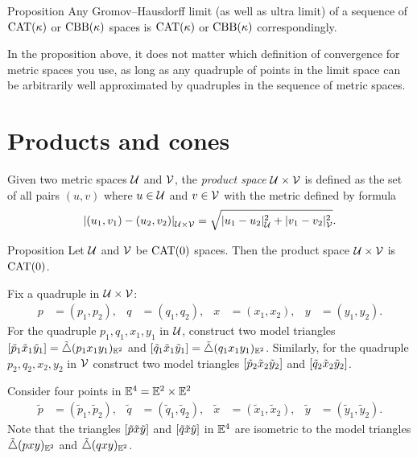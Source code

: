 \begin{thm}{Proposition}\label{prop:cat-limit}
Any Gromov--Hausdorff limit (as well as ultra limit) of a sequence of $\mathrm{CAT}(\kappa)$ or $\mathrm{CBB}(\kappa)$ spaces is $\mathrm{CAT}(\kappa)$ or $\mathrm{CBB}(\kappa)$ correspondingly. 
\end{thm}

In the proposition above, 
it does not matter which definition of convergence for metric spaces you use, 
as long as any quadruple of points in the limit space can be arbitrarily well approximated by  quadruples in the sequence of metric spaces. 

\section{Products and cones}

Given two metric spaces $\mathcal{U}$ and $\mathcal{V}$, the \emph{product space} 
$\mathcal{U}\times\mathcal{V}$ is defined as the set of all pairs $(u,v)$ where $u\in\mathcal{U}$ and $v\in \mathcal{V}$ 
with the metric defined by formula
\[\dist{(u_1,v_1)}{(u_2,v_2)}{\spc{U}\times\spc{V}}=\sqrt{\dist[2]{u_1}{u_2}{\spc{U}}+\dist[2]{v_1}{v_2}{\spc{V}}}.\]

\begin{thm}{Proposition}\label{ex:product-CAT}
Let $\mathcal{U}$ and $\mathcal{V}$ be $\mathrm{CAT}(0)$ spaces.
Then the product space $\mathcal{U}\times\mathcal{V}$ is $\mathrm{CAT}(0)$.
\end{thm}

Fix a quadruple in $\mathcal{U}\times \mathcal{V}$:
\begin{align*}
p&=(p_1,p_2),
&
q&=(q_1,q_2), 
&
x&=(x_1,x_2),
&
y&=(y_1,y_2).
\end{align*}
For the quadruple $p_1,q_1,x_1,y_1$ in $\mathcal{U}$,
construct two model triangles $[\tilde p_1\tilde x_1\tilde y_1]=\tilde\triangle(p_1x_1y_1)_{\mathbb{E}^2}$ 
and $[\tilde q_1\tilde x_1\tilde y_1]=\tilde\triangle(q_1x_1y_1)_{\mathbb{E}^2}$.  
Similarly, for the quadruple $p_2,q_2,x_2,y_2$ in $\mathcal{V}$
construct two model triangles $[\tilde p_2\tilde x_2\tilde y_2]$ and $[\tilde q_2\tilde x_2\tilde y_2]$.

Consider four points in $\mathbb{E}^4=\mathbb{E}^2\times\mathbb{E}^2$ 
\begin{align*}
\tilde p&=(\tilde p_1,\tilde p_2),
&
\tilde q&=(\tilde q_1,\tilde q_2),
&
\tilde x&=(\tilde x_1,\tilde x_2),
&
\tilde y&=(\tilde y_1,\tilde y_2).
\end{align*}
Note that the triangles $[\tilde p\tilde x\tilde y]$ and $[\tilde q\tilde x\tilde y]$ in $\mathbb{E}^4$ are isometric to the model triangles 
$\tilde\triangle(pxy)_{\mathbb{E}^2}$ and $\tilde\triangle(qxy)_{\mathbb{E}^2}$.

